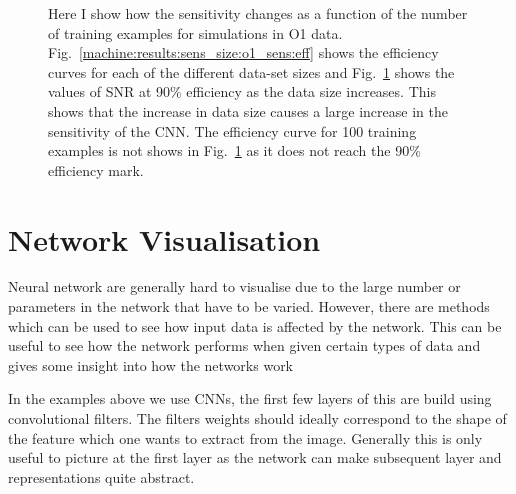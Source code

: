 \begin{figure}[h]
\begin{subfigure}[h]{0.5\textwidth}
		\caption{}
		\label{machine:results:sens_size:o1_sens:train}
	\end{subfigure}
	\caption[Sensitivity with size of data set for O1 simulations.]{Here I show how the sensitivity changes as a function of the number of training examples for simulations in O1 data. Fig.~\ref{machine:results:sens_size:o1_sens:eff} shows the efficiency curves for each of the different data-set sizes and Fig.~\ref{machine:results:sens_size:o1_sens:train} shows the values of \gls{SNR} at 90\% efficiency as the data size increases. This shows that the increase in data size causes a large increase in the sensitivity of the \gls{CNN}. The efficiency curve for 100 training examples is not shows in Fig.~\ref{machine:results:sens_size:o1_sens:train} as it does not reach the 90\% efficiency mark.}
	\label{machine:results:sens_size:o1_sens}
\end{figure}



\section{\label{cnn:networkvis}Network Visualisation}

Neural network are generally hard to visualise due to the large number or parameters in the network that have to be varied.
However, there are methods which can be used to see how input data is affected by the network.
This can be useful to see how the network performs when given certain types of data and gives some insight into how the networks work

In the examples above we use \glspl{CNN}, the first few layers of this are build using convolutional filters.
The filters weights should ideally correspond to the shape of the feature which one wants to extract from the image. 
Generally this is only useful to picture at the first layer as the network can make subsequent layer and representations quite abstract.



